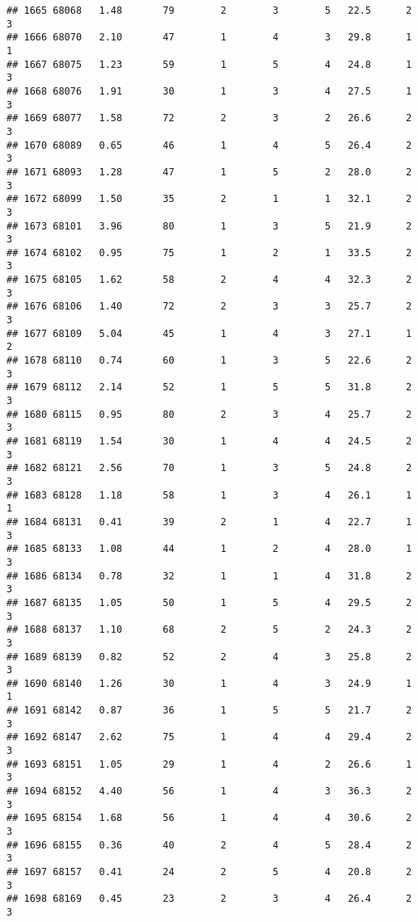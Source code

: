 \documentclass[
]{article}
\begin{document}
\begin{verbatim}
## 1665 68068   1.48       79        2        3        5   22.5      2      3
## 1666 68070   2.10       47        1        4        3   29.8      1      1
## 1667 68075   1.23       59        1        5        4   24.8      1      3
## 1668 68076   1.91       30        1        3        4   27.5      1      3
## 1669 68077   1.58       72        2        3        2   26.6      2      3
## 1670 68089   0.65       46        1        4        5   26.4      2      3
## 1671 68093   1.28       47        1        5        2   28.0      2      3
## 1672 68099   1.50       35        2        1        1   32.1      2      3
## 1673 68101   3.96       80        1        3        5   21.9      2      3
## 1674 68102   0.95       75        1        2        1   33.5      2      3
## 1675 68105   1.62       58        2        4        4   32.3      2      3
## 1676 68106   1.40       72        2        3        3   25.7      2      3
## 1677 68109   5.04       45        1        4        3   27.1      1      2
## 1678 68110   0.74       60        1        3        5   22.6      2      3
## 1679 68112   2.14       52        1        5        5   31.8      2      3
## 1680 68115   0.95       80        2        3        4   25.7      2      3
## 1681 68119   1.54       30        1        4        4   24.5      2      3
## 1682 68121   2.56       70        1        3        5   24.8      2      3
## 1683 68128   1.18       58        1        3        4   26.1      1      1
## 1684 68131   0.41       39        2        1        4   22.7      1      3
## 1685 68133   1.08       44        1        2        4   28.0      1      3
## 1686 68134   0.78       32        1        1        4   31.8      2      3
## 1687 68135   1.05       50        1        5        4   29.5      2      3
## 1688 68137   1.10       68        2        5        2   24.3      2      3
## 1689 68139   0.82       52        2        4        3   25.8      2      3
## 1690 68140   1.26       30        1        4        3   24.9      1      1
## 1691 68142   0.87       36        1        5        5   21.7      2      3
## 1692 68147   2.62       75        1        4        4   29.4      2      3
## 1693 68151   1.05       29        1        4        2   26.6      1      3
## 1694 68152   4.40       56        1        4        3   36.3      2      3
## 1695 68154   1.68       56        1        4        4   30.6      2      3
## 1696 68155   0.36       40        2        4        5   28.4      2      3
## 1697 68157   0.41       24        2        5        4   20.8      2      3
## 1698 68169   0.45       23        2        3        4   26.4      2      3

\end{verbatim}
\end{document}
